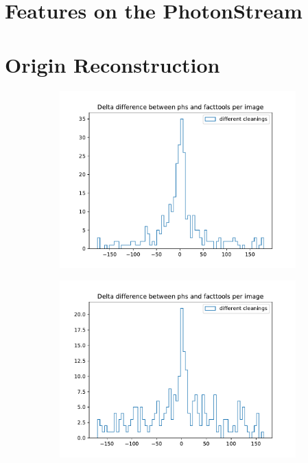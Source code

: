 \section{Features on the PhotonStream}
%


\section{Origin Reconstruction}
%
\begin{figure}
  \begin{subfigure}{0.5\textwidth}
    \includegraphics[width=1.1\textwidth]{Plots/delta_diff_hist_DBSCAN_pe_20131104_162.pdf}
  \end{subfigure}
  \begin{subfigure}{0.5\textwidth}
    \includegraphics[width=1.1\textwidth]{Plots/delta_diff_hist_thresholds_pe_20131104_162.pdf}

\end{subfigure}
\end{figure}
